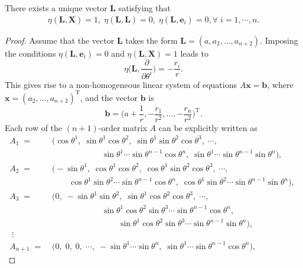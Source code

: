 \documentclass[10pt,a4paper]{amsart}
\begin{document}
     \begin{prop}\label{prop-unique}
     	There exists a unique vector $\mathbf{L}$ satisfying that
     	\begin{align*}
     		\eta(\mathbf{L},\mathbf{X})=1,\; \eta(\mathbf{L},\mathbf{L})=0,\;\eta(\mathbf{L},\mathbf{e}_i)=0,\forall\;i=1,\cdots,n.
     	\end{align*}
     \end{prop}

     \begin{proof}
     	Assume that the vector $\mathbf{L}$ takes the form $\mathbf{L}=(a,a_2,\dots,a_{n+2})$. Imposing the conditions $\eta(\mathbf{L},\mathbf{e}_i)=0$ and $\eta(\mathbf{L},\mathbf{X})=1$ leads to
     	\[
     	\eta\Big(\mathbf{L},\frac{\partial}{\partial \theta^i}\Big) = -\frac{r_i}{r}.
     	\]  
     	This gives rise to a non-homogeneous linear system of equations $A\mathbf{x}=\mathbf{b}$, where $\mathbf{x} = (a_2,\dots,a_{n+2})^\mathrm{T}$, and the vector $\mathbf{b}$ is
     	\[
     	\mathbf{b} = \Big(a+\frac{1}{r}, -\frac{r_1}{r^2},\dots,-\frac{r_n}{r^2}\Big)^\mathrm{T}.
     	\]  
     	Each row of the $(n+1)$-order matrix $A$ can be explicitly written as  
     	       \begin{align*}
     		A_1\;=\;&\Big(\cos\theta^1,\;\sin\theta^1\cos\theta^2,\; \sin\theta^1\sin\theta^2\cos\theta^3,\; \cdots,\; \\
     		&\qquad\qquad\qquad \sin\theta^1\cdots\sin\theta^{n-1}\cos\theta^n,\; \sin\theta^1\cdots\sin\theta^{n-1}\sin\theta^n \Big),\;\\
     		A_2\;=\;&\Big(-\sin\theta^1,\; \cos\theta^1\cos\theta^2,\; \cos\theta^1\sin\theta^2\cos\theta^3,\; \cdots,\; \\
     		&\qquad\cos\theta^1\sin\theta^2\cdots\sin\theta^{n-1}\cos\theta^n,\; \cos\theta^1\sin\theta^2\cdots\sin\theta^{n-1}\sin\theta^n\Big),\; \\
     		A_3\;=\;&\Big(0,\;-\sin\theta^1\sin\theta^2,\; \sin\theta^1\cos\theta^2\cos\theta^3,\; \cdots,\; \\
     		&\qquad\qquad\qquad \sin\theta^1\cos\theta^2\sin\theta^3\cdots\sin\theta^{n-1}\cos\theta^n,\; \\
     		&\qquad\qquad\qquad\qquad\sin\theta^1\cos\theta^2\sin\theta^3\cdots\sin\theta^{n-1}\sin\theta^n \Big),\;\\
     		\;\vdots&\\
     		A_{n+1}\;=\;&\Big(0,\; 0,\; 0,\; \cdots,\; -\sin\theta^1\cdots\sin\theta^n,\; \sin\theta^1\cdots\sin\theta^{n-1}\cos\theta^n \Big),\;

\end{align*}
\end{proof}
\end{document}
